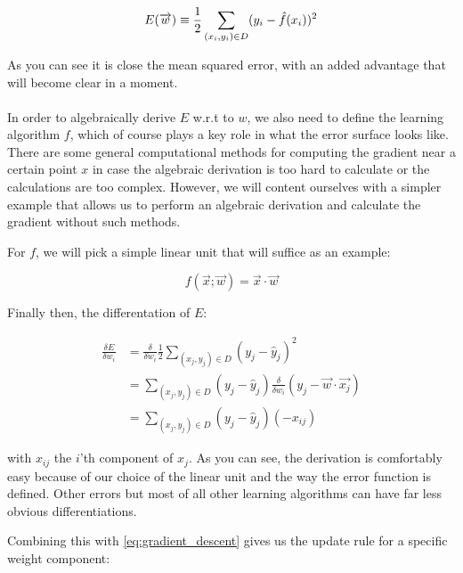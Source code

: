 \begin{equation}
  E(\overrightarrow{w}) \equiv \frac{1}{2} \\
  \sum_{(x_i, y_i) \in D}(y_i - \hat{f}(x_i))^2
\end{equation}

As you can see it is close the mean squared error,
with an added advantage that will become clear in a moment.

\paragraph{}
In order to algebraically derive $E$ w.r.t to $w$,
we also need to define the learning algorithm $f$,
which of course plays a key role
in what the error surface looks like.
There are some general computational methods %
for computing the gradient near a certain point $x$
in case the algebraic derivation is too hard to calculate
or the calculations are too complex.
However, we will content ourselves with a simpler example
that allows us to perform an algebraic derivation
and calculate the gradient without such methods.

For $f$, we will pick
a simple linear unit that will suffice as an example:

$$
f(\overrightarrow{x};\overrightarrow{w}) = \overrightarrow{x} \cdot \overrightarrow{w}
$$

Finally then, the differentation of $E$:

\begin{equation}
  \begin{split}
    \frac{\delta E}{\delta w_i} &= \frac{\delta}{\delta w_i} \frac{1}{2}
    \sum_{(x_j, y_j) \in D} (y_j - \hat{y}_j)^2 \\
    &= \sum_{(x_j, y_j) \in D}(y_j - \hat{y}_j)
    \frac{\delta}{\delta w_i}(y_j - \overrightarrow{w} \cdot \overrightarrow{x_j}) \\
    &= \sum_{(x_j, y_j) \in D}(y_j - \hat{y}_j)(-x_{ij})
  \end{split}
\end{equation}

with $x_{ij}$ the $i$'th component of $x_j$.
As you can see, the derivation is comfortably easy
because of our choice of the linear unit
and the way the error function is defined.
Other errors but most of all other learning
algorithms can have far less obvious differentiations.

Combining this with \ref{eq:gradient_descent}
gives us the update rule for a specific weight component:

